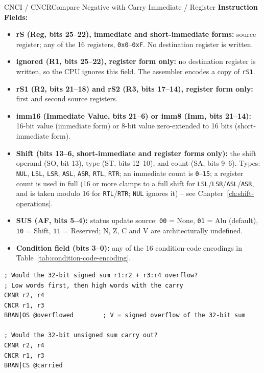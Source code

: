 \begin{instructionbox}{CNCI / CNCR}{Compare Negative with Carry Immediate / Register}
	\textbf{Instruction Fields:}
	\begin{itemize}
		\item \textbf{rS (Reg, bits 25--22), immediate and short-immediate forms:} source register; any of the 16 registers,
		      \texttt{0x0}--\texttt{0xF}. No destination register is written.
		\item \textbf{ignored (R1, bits 25--22), register form only:} no destination register is written, so the CPU ignores
		      this field. The assembler encodes a copy of \texttt{rS1}.
		\item \textbf{rS1 (R2, bits 21--18) and rS2 (R3, bits 17--14), register form only:} first and second source registers.
		\item \textbf{imm16 (Immediate Value, bits 21--6) or imm8 (Imm, bits 21--14):} 16-bit value (immediate form) or 8-bit
		      value zero-extended to 16 bits (short-immediate form).
		\item \textbf{Shift (bits 13--6, short-immediate and register forms only):} the shift operand (SO, bit 13), type (ST, bits 12--10), and count (SA, bits 9--6). Types:
		      \texttt{NUL}, \texttt{LSL},
		      \texttt{LSR}, \texttt{ASL}, \texttt{ASR}, \texttt{RTL}, \texttt{RTR}; an immediate count is
		      \texttt{0}--\texttt{15}; a register count is used in full (16 or more clamps to a full shift for \texttt{LSL}/\texttt{LSR}/\texttt{ASL}/\texttt{ASR}, and is taken modulo 16 for \texttt{RTL}/\texttt{RTR}; \texttt{NUL} ignores it) -- see Chapter~\ref{ch:shift-operations}.
		\item \textbf{SUS (AF, bits 5--4):} status update source: \texttt{00} = None, \texttt{01} = Alu (default), \texttt{10} = Shift, \texttt{11} =
		      Reserved; N, Z, C and V are architecturally undefined.
		\item \textbf{Condition field (bits 3--0):} any of the 16 condition-code encodings in
		      Table~\ref{tab:condition-code-encoding}.
	\end{itemize}

	\begin{example}
		\begin{lstlisting}
; Would the 32-bit signed sum r1:r2 + r3:r4 overflow?
; Low words first, then high words with the carry
CMNR r2, r4
CNCR r1, r3
BRAN|OS @overflowed        ; V = signed overflow of the 32-bit sum

; Would the 32-bit unsigned sum carry out?
CMNR r2, r4
CNCR r1, r3
BRAN|CS @carried
		\end{lstlisting}
		\caption{Testing 32-bit Sums Without Writing Them}
	\end{example}


\end{instructionbox}
